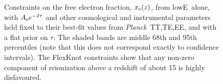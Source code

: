 \documentclass[longauth,traditabstract]{aa}
\def\Planck{\textit{Planck}}
\newcommand{\mksym}[1]{\ifmmode {\rm #1}\else #1\fi}
\newcommand{\TTTEEE}{\mksym{TT,TE,EE}}
\newcommand{\planckTTTEEEonly}{\planck\ \TTTEEE}
\newcommand{\lowE}{\mksym{lowE}}
\newcommand{\As}{A_{\rm s}}
\newcommand{\planck}{\Planck}
\begin{document}
\begin{figure}[bhtp!]
\begin{center}
\end{center}
\caption{Constraints on the free electron fraction, $x_{\rm e}(z)$, from
\lowE\ alone, with $\As e^{-2\tau}$ and other cosmological and
instrumental parameters held fixed to their best-fit values from \planckTTTEEEonly, and with a
flat prior on $\tau$. The shaded bands are middle 68th and 95th percentiles
(note that this does not correspond exactly to confidence intervals). The FlexKnot
constraints show that any non-zero component of reionization above a redshift
of about 15 is highly disfavoured.
}
\label{fig:reio_hists}
\end{figure}
\end{document}
